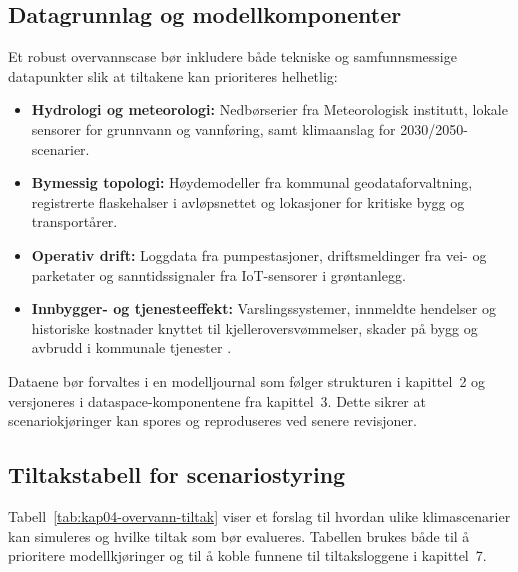 \subsection{Datagrunnlag og modellkomponenter}
Et robust overvannscase bør inkludere både tekniske og samfunnsmessige datapunkter slik at tiltakene kan prioriteres helhetlig:
\begin{itemize}
    \item \textbf{Hydrologi og meteorologi:} Nedbørserier fra Meteorologisk institutt, lokale sensorer for grunnvann og vannføring, samt klimaanslag for 2030/2050-scenarier.
    \item \textbf{Bymessig topologi:} Høydemodeller fra kommunal geodataforvaltning, registrerte flaskehalser i avløpsnettet og lokasjoner for kritiske bygg og transportårer.
    \item \textbf{Operativ drift:} Loggdata fra pumpestasjoner, driftsmeldinger fra vei- og parketater og sanntidssignaler fra IoT-sensorer i grøntanlegg.
    \item \textbf{Innbygger- og tjenesteeffekt:} Varslingssystemer, innmeldte hendelser og historiske kostnader knyttet til kjelleroversvømmelser, skader på bygg og avbrudd i kommunale tjenester \citep{miljodir2024indikatorveileder}.
\end{itemize}
Dataene bør forvaltes i en modelljournal som følger strukturen i kapittel~2 og versjoneres i dataspace-komponentene fra kapittel~3. Dette sikrer at scenariokjøringer kan spores og reproduseres ved senere revisjoner.

\subsection{Tiltakstabell for scenariostyring}
Tabell~\ref{tab:kap04-overvann-tiltak} viser et forslag til hvordan ulike klimascenarier kan simuleres og hvilke tiltak som bør evalueres. Tabellen brukes både til å prioritere modellkjøringer og til å koble funnene til tiltaksloggene i kapittel~7.

